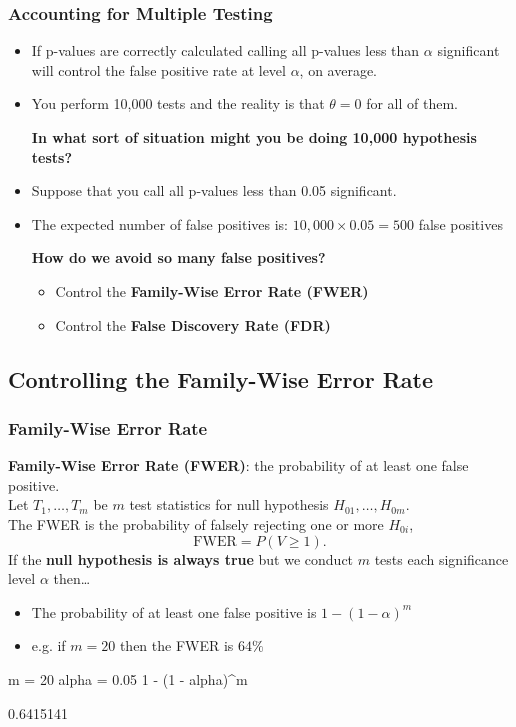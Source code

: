 \documentclass[a4paper]{article}
\begin{document}
\subsubsection{Accounting for Multiple Testing}
\begin{itemize}
	\item If p-values  are correctly calculated calling all p-values less than \( \alpha \) significant will control the false positive rate at level \( \alpha \), on average.
	\item You perform 10,000 tests and the reality is that \( \theta = 0 \) for all of them.
	\begin{greenbox}
		\textbf{In what sort of situation might you be doing 10,000 hypothesis tests?}
	\end{greenbox}
	\item Suppose that you call all p-values less than 0.05 significant.
	\item The expected number of false positives is: \( 10,000 \times 0.05 = 500 \) false positives 
	\begin{greenbox}
		\textbf{How do we avoid so many false positives?}
		\begin{itemize}
			\item Control the \textcolor{mygreen}{\textbf{Family-Wise Error Rate (FWER)}}
			\item Control the \textcolor{myred}{\textbf{False Discovery Rate (FDR)}}
		\end{itemize}
	\end{greenbox}
\end{itemize}
\subsection{Controlling the Family-Wise Error Rate}
\subsubsection{Family-Wise Error Rate}
\textcolor{myred}{\textbf{Family-Wise Error Rate (FWER)}}: the probability of at least one false positive.\\
Let \( T_1,\dotsc,T_m \) be \( m \) test statistics for null hypothesis \( H_{01},\dotsc,H_{0m} \).\\
The FWER is the probability of falsely rejecting one or more \( H_{0i} \),
\[
	\mathrm{FWER} = P(V \geq 1).
\]
If the \textbf{null hypothesis is always true} but we conduct \( m \) tests each significance level \( \alpha \) then\dots
\begin{itemize}
	\item The probability of at least one false positive is \( 1 - (1 - \alpha)^m \)
	\item e.g. if \( m = 20 \) then the FWER is \( 64\% \) 
\end{itemize}
\begin{Schunk}
\begin{Sinput}
m = 20
alpha = 0.05
1 - (1 - alpha)^m
\end{Sinput}
\begin{Soutput}
[1] 0.6415141
\end{Soutput}
\end{Schunk}
\end{document}
